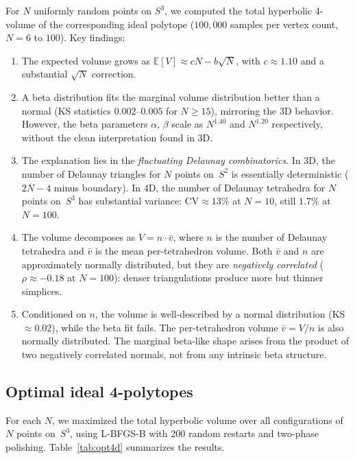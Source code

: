 \documentclass[11pt]{article}
\begin{document}
For $N$ uniformly random points on $S^3$, we computed the total
hyperbolic 4-volume of the corresponding ideal polytope
($100{,}000$ samples per vertex count, $N = 6$ to $100$).
Key findings:

\begin{enumerate}
\item The expected volume grows as $\mathbb{E}[V] \approx cN -
  b\sqrt{N}$, with $c \approx 1.10$ and a substantial $\sqrt{N}$
  correction.

\item A beta distribution fits the marginal volume distribution
  better than a normal (KS statistics $0.002$--$0.005$ for
  $N \ge 15$), mirroring the 3D behavior.  However, the beta
  parameters $\alpha$, $\beta$ scale as $N^{1.40}$ and $N^{1.20}$
  respectively, without the clean interpretation found in 3D.

\item The explanation lies in the \emph{fluctuating Delaunay
  combinatorics}.  In 3D, the number of Delaunay triangles for
  $N$ points on~$S^2$ is essentially deterministic ($2N - 4$
  minus boundary).  In 4D, the number of Delaunay tetrahedra for
  $N$ points on~$S^3$ has substantial variance: $\mathrm{CV}
  \approx 13\%$ at $N = 10$, still $1.7\%$ at $N = 100$.

\item The volume decomposes as $V = n \cdot \bar{v}$, where $n$
  is the number of Delaunay tetrahedra and $\bar{v}$ is the mean
  per-tetrahedron volume.  Both $\bar{v}$ and $n$ are
  approximately normally distributed, but they are \emph{negatively
  correlated} ($\rho \approx -0.18$ at $N = 100$): denser
  triangulations produce more but thinner simplices.

\item Conditioned on $n$, the volume is well-described by a normal
  distribution (KS~$\approx 0.02$), while the beta fit fails.
  The per-tetrahedron volume $\bar{v} = V/n$ is also normally
  distributed.  The marginal beta-like shape arises from the
  product of two negatively correlated normals, not from any
  intrinsic beta structure.
\end{enumerate}

\subsection{Optimal ideal 4-polytopes}

For each $N$, we maximized the total hyperbolic volume over all
configurations of $N$ points on~$S^3$, using L-BFGS-B with
200 random restarts and two-phase polishing.
Table~\ref{tab:opt4d} summarizes the results.
\end{document}
